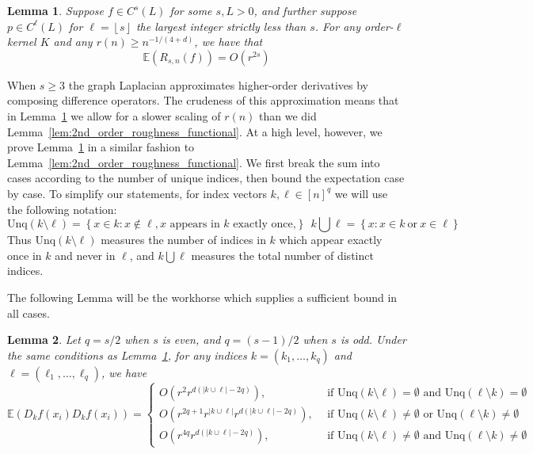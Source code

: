 \documentclass{article}
\newcommand{\abs}[1]{\left \lvert #1 \right \rvert}
\newcommand{\set}[1]{\left\{#1\right\}}
\newcommand{\floor}[1]{\left\lfloor #1 \right\rfloor}
\newcommand{\1}{\mathbf{1}}
\newcommand{\Ebb}{\mathbb{E}}
\newcommand{\Unq}{\mathrm{Unq}}
\theoremstyle{alden}
\theoremstyle{aldenthm}
\newtheorem{lemma}{Lemma}
\theoremstyle{definition}
\theoremstyle{remark}
\begin{document}
\begin{lemma}
	\label{lem:roughness_functional_expectation}
	Suppose $f \in C^{s}(L)$ for some $s,L > 0$, and further suppose $p \in C^{\ell}(L)$ for $\ell = \floor{s}$ the largest integer strictly less than $s$. For any order-$\ell$ kernel $K$ and any $r(n) \geq n^{-1/(4+d)}$, we have that
	\begin{equation*}
	\Ebb(R_{s,n}(f)) = O(r^{2s})
	\end{equation*} 
\end{lemma}
When $s \geq 3$ the graph Laplacian approximates higher-order derivatives by composing difference operators. The crudeness of this approximation means that in Lemma~\ref{lem:roughness_functional_expectation} we allow for a slower scaling of $r(n)$ than we did Lemma~\ref{lem:2nd_order_roughness_functional}. At a high level, however, we prove Lemma~\ref{lem:roughness_functional_expectation} in a similar fashion to Lemma~\ref{lem:2nd_order_roughness_functional}. We first break the sum into cases according to the number of unique indices, then bound the expectation case by case. To simplify our statements, for index vectors $k,\ell \in [n]^q$ we will use the following notation:
\begin{equation*}
\textrm{Unq}(k \setminus \ell) = \set{x \in k: x \not\in \ell, \textrm{$x$ appears in $k$ exactly once,}}~~ k \bigcup \ell = \set{x: x \in k ~\textrm{or}~ x \in \ell}
\end{equation*}
Thus $\textrm{Unq}(k \setminus \ell)$ measures the number of indices in $k$ which appear exactly once in $k$ and never in $\ell$, and $k \bigcup \ell$ measures the total number of distinct indices.


The following Lemma will be the workhorse which supplies a sufficient bound in all cases.
\begin{lemma}
	\label{lem:expected_difference_operators}
	Let $q = s/2$ when $s$ is even, and $q = (s - 1)/2$ when $s$ is odd. Under the same conditions as Lemma~\ref{lem:roughness_functional_expectation}, for any indices $k = (k_1,\ldots,k_q)$ and $\ell = (\ell_1,\ldots,\ell_q)$, we have
	\begin{equation}
	\Ebb(D_kf(x_i) D_kf(x_i)) =
	\begin{cases*}
	O(r^{2} r^{d(\abs{k \cup \ell} - 2q)}), & ~~\textrm{if $\Unq(k\setminus\ell) = \emptyset$ and $\Unq(\ell\setminus k) = \emptyset$}~ 
	\\
	O(r^{2q + 1} r^{\abs{k \cup \ell}} r^{d(\abs{k \cup \ell} - 2q)}), & ~~\textrm{if $\Unq(k\setminus\ell) \neq \emptyset$ or $\Unq(\ell\setminus k) \neq \emptyset$} \\
	O(r^{4q} r^{d(\abs{k \cup \ell} - 2q)}), & ~~\textrm{if $\Unq(k\setminus\ell) \neq \emptyset$ and $\Unq(\ell\setminus k) \neq \emptyset$}
	\end{cases*}
	\end{equation}
\end{lemma}
\end{document}
